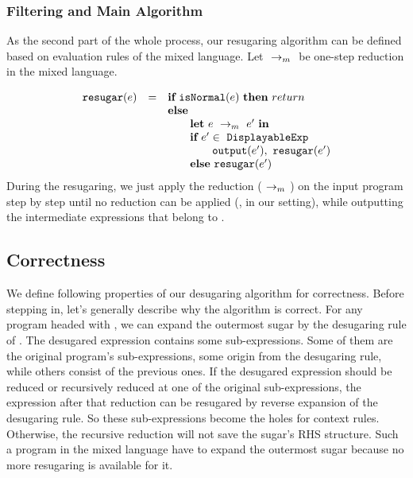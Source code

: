 
\subsubsection{Filtering and Main Algorithm}

As the second part of the whole process, our resugaring algorithm can be defined based on evaluation rules of the mixed language. Let $~\rightarrow_m~$ be one-step reduction in the mixed language.

\[
\begin{array}{llll}
\mbox{\tt resugar} (e) &=& \mbox{\rm \bf if}~\mbox{\tt isNormal}(e)~\mbox{\rm \bf then}~return\\
              & & \mbox{\rm \bf else}~\\
							& & \qquad \mbox{\rm \bf let}~e ~\rightarrow_m~e'~\mbox{\rm \bf in}\\
							& & \qquad \mbox{\rm \bf if}~e' \in~\mbox{\tt DisplayableExp} \\
							& & \qquad \qquad \mbox{\tt output}(e'),~\mbox{\tt resugar}(e')\\
							& & \qquad \mbox{\rm \bf else}~\mbox{\tt resugar}(e')
\end{array}
\]
During the resugaring, we just apply the reduction ($~\rightarrow_m~$) on the input program step by step until no reduction can be applied (,  in our setting), while outputting the intermediate expressions that belong to .


\subsection{Correctness}
\label{mark:correct}


We define following properties of our desugaring algorithm for correctness. Before stepping in, let's generally describe why the algorithm is correct. For any program headed with , we can expand the outermost sugar by the desugaring rule of . The desugared expression contains some sub-expressions. Some of them are the original program's sub-expressions, some origin from the desugaring rule, while others consist of the previous ones. If the desugared expression should be reduced or recursively reduced at one of the original sub-expressions, the expression after that reduction can be resugared by reverse expansion of the desugaring rule. So these sub-expressions become the holes for context rules. Otherwise, the recursive reduction will not save the sugar's RHS structure. Such a program in the mixed language have to expand the outermost sugar because no more resugaring is available for it.



